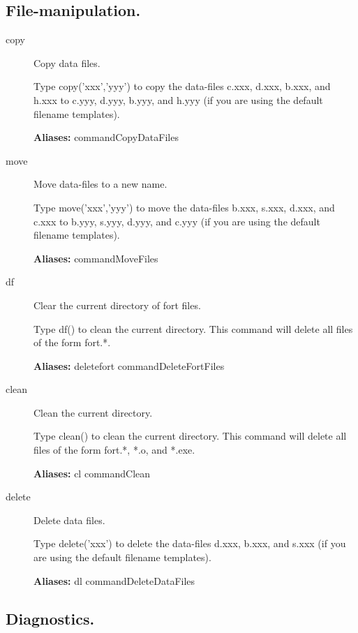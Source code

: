 \documentclass[12pt]{report}
\begin{document}
\subsection{File-manipulation.} \label{sec:clui_ref_files}
\begin{description}
\item[copy]
Copy data files.

    Type copy('xxx','yyy') to copy the data-files c.xxx, d.xxx, b.xxx,
    and h.xxx to c.yyy, d.yyy, b.yyy, and h.yyy (if you are using the
    default filename templates).
    
\textbf{Aliases:} commandCopyDataFiles

\item[move]
Move data-files to a new name.

    Type move('xxx','yyy') to move the data-files b.xxx, s.xxx, d.xxx,
    and c.xxx to b.yyy, s.yyy, d.yyy, and c.yyy (if you are using the
    default filename templates).  

\textbf{Aliases:} commandMoveFiles

\item[df]
Clear the current directory of fort files.

    Type df() to clean the current directory.  This command will
    delete all files of the form fort.*.
    
\textbf{Aliases:} deletefort commandDeleteFortFiles

\item[clean]
Clean the current directory.

    Type clean() to clean the current directory.  This command will
    delete all files of the form fort.*, *.o, and *.exe.
    
\textbf{Aliases:}
cl commandClean

\item[delete]
Delete data files.

    Type delete('xxx') to delete the data-files d.xxx, b.xxx, and s.xxx
    (if you are using the default filename templates).
    
\textbf{Aliases:} dl commandDeleteDataFiles
\end{description}

\subsection{Diagnostics.} \label{sec:clui_ref_diagnostics}
\end{document}
